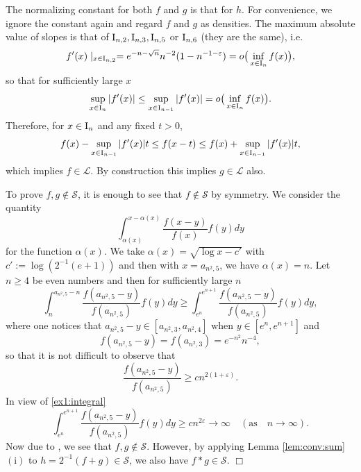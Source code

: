 \documentclass[12pt,leqno]{amsart}
\newcommand{\rI}{{\rm I}}
\newcommand{\vep}{\varepsilon}
\newcommand{\cals}{{\mathcal S}}
\newcommand{\call}{{\mathcal L}}
\newcommand{\1}{{\mathbf 1}}
\begin{document}
The normalizing constant for both $f$ and $g$ is that for $h$.  
For convenience, we ignore the constant again and regard $f$ and $g$ as densities. 
The maximum absolute value of slopes is that of $\rI_{n,2},\rI_{n,3},\rI_{n,5}$ or $\rI_{n,6}$ (they are the same), i.e. 
\[
 f'(x) \mid_{x\in \rI_{n,2}} =e^{-n-\sqrt{n}}n^{-2}(1-n^{-1-\vep}) =o \big(\inf_{x\in \rI_n} f(x)\big),
\]
so that for sufficiently large $x$  
\[
 \sup_{x\in \rI_n}|f'(x)| \le \sup_{x\in \rI_{n-1}} |f'(x)| =o\big(
\inf_{x\in \rI_n}f(x)
\big).
\]
Therefore, for $x\in \rI_n$ and any fixed $t>0$,
\[
 f(x)-\sup_{x\in \rI_{n-1}}|f'(x)|  t \le f(x-t) \le f(x)+ \sup_{x\in \rI_{n-1}}|f'(x)| t,
\]
which implies $f\in \call$. By construction this implies $g\in \call$ also. 

To prove $f,g\notin \cals$, it is enough to see that $f\not \in \cals$ by symmetry. We consider the quantity 
\[
 \int_{\alpha(x)}^{x-\alpha(x)} \frac{f(x-y)}{f(x)}f(y)dy
\]
for the function $\alpha(x)$. 
We take $\alpha(x)=\sqrt{\log x-c'}$ with 
$c':=\log(2^{-1}(e+1))$ and then with $x=a_{n^2,5}$, we have $\alpha(x)=n$. Let $n\ge 4$ be even numbers and 
then for sufficiently large $n$ 
\[
 \int_{n}^{a_{n^2,5}-n}\frac{f(a_{n^2,5}-y)}{f(a_{n^2,5})}f(y)dy \ge \int_{e^n}^{e^{n+1}}\frac{f(a_{n^2,5}-y)}{f(a_{n^2,5})} f(y)dy, 
\]
where one notices that $a_{n^2,5}-y \in [a_{n^2,3},a_{n^2,4}]$ when $ y\in [e^n,e^{n+1}]$ and 
\[
 f(a_{n^2,5}-y)=f(a_{n^2,3}) =e^{-n^2}n^{-4},
\]
so that it is not difficult to observe that 
\[
 \frac{ f(a_{n^2,5}-y)}{ f(a_{n^2,5})} \ge cn^{2(1+\vep)}. 
\]
In view of \eqref{ex1:integral} 
\[
 \int_{e^n}^{e^{n+1}}\frac{f(a_{n^2,5}-y)}{f(a_{n^2,5})} f(y)dy \ge cn^{2\vep} \to\infty\quad (\text{as}\quad n\to\infty). 
\]
Now due to \cite[Theorem 4.7 (ii)]{Foss:Korshunov:Zachary:2013}, we see that $f, g\notin \cals$. 
However, by applying Lemma \ref{lem:conv:sum} $(\mathrm{i})$ to $h=2^{-1}(f+g)\in\cals$, we also have $f\ast g\in \cals$. 
\hfill $\Box$\\
 
\end{document}
